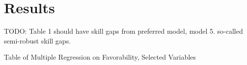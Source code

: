 \documentclass[review]{elsarticle}
\begin{document}

%

\section{Results}

TODO: Table 1 should have skill gaps from preferred model, model 5. so-called semi-robust skill gaps.

\begin{table}
    \caption{Table of Multiple Regression on Favorability, Selected Variables}
    \resizebox{\columnwidth}{!}{
        
    }
    \label{tab:table_new_ols}
\end{table}

\end{document}
